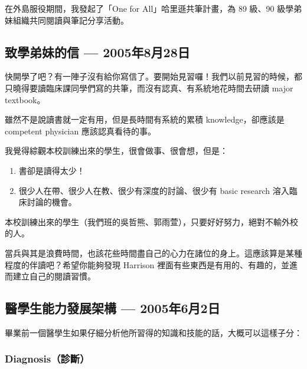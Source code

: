 \documentclass[12pt,a4paper]{article}
\newenvironment{myquote}{%
    \begin{tcolorbox}[
        colback=quote_bg,
        colframe=emergency_gray,
        boxrule=0pt,
        leftrule=3pt,
        arc=0pt,
        left=10pt,
        right=10pt,
        top=8pt,
        bottom=8pt
    ]
    \itshape
}{%
    \end{tcolorbox}
}
\begin{document}
在外島服役期間，我發起了「One for All」哈里遜共筆計畫，為 89 級、90 級學弟妹組織共同閱讀與筆記分享活動。

\subsection{致學弟妹的信 — 2005年8月28日}

快開學了吧？有一陣子沒有給你寫信了。要開始見習囉！我們以前見習的時候，都只曉得要讀臨床課同學們寫的共筆，而沒有認真、有系統地花時間去研讀 major textbook。

雖然不是說讀書就一定有用，但是長時間有系統的累積 knowledge，卻應該是 competent physician 應該認真看待的事。

我覺得綜觀本校訓練出來的學生，很會做事、很會想，但是：
\begin{enumerate}
    \item 書卻是讀得太少！
    \item 很少人在帶、很少人在教、很少有深度的討論、很少有 basic research 溶入臨床討論的機會。
\end{enumerate}

本校訓練出來的學生（我們班的吳哲熊、郭雨萱），只要好好努力，絕對不輸外校的人。

\begin{myquote}
當兵與其是浪費時間，也該花些時間盡自己的心力在諸位的身上。這應該算是某種程度的伴讀吧？希望你能夠發現 Harrison 裡面有些東西是有用的、有趣的，並進而建立自己的閱讀習慣。
\end{myquote}

\subsection{醫學生能力發展架構 — 2005年6月2日}

畢業前一個醫學生如果仔細分析他所習得的知識和技能的話，大概可以這樣子分：

\subsubsection{Diagnosis（診斷）}
\end{document}
